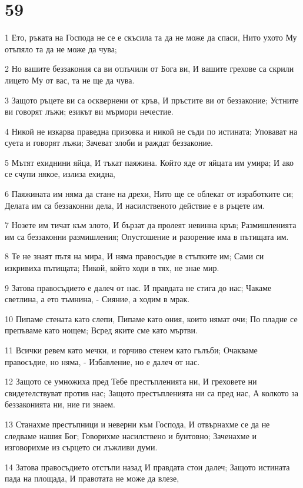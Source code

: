 \chapter{59}

\par 1 Ето, ръката на Господа не се е скъсила та да не може да спаси, Нито ухото Му отъпяло та да не може да чува;
\par 2 Но вашите беззакония са ви отлъчили от Бога ви, И вашите грехове са скрили лицето Му от вас, та не ще да чува.
\par 3 Защото ръцете ви са осквернени от кръв, И пръстите ви от беззаконие; Устните ви говорят лъжи; езикът ви мърмори нечестие.
\par 4 Никой не изкарва праведна призовка и никой не съди по истината; Уповават на суета и говорят лъжи; Зачеват злоби и раждат беззаконие.
\par 5 Мътят ехиднини яйца, И тъкат паяжина. Който яде от яйцата им умира; И ако се счупи някое, излиза ехидна,
\par 6 Паяжината им няма да стане на дрехи, Нито ще се облекат от изработките си; Делата им са беззаконни дела, И насилственото действие е в ръцете им.
\par 7 Нозете им тичат към злото, И бързат да пролеят невинна кръв; Размишленията им са беззаконни размишления; Опустошение и разорение има в пътищата им.
\par 8 Те не знаят пътя на мира, И няма правосъдие в стъпките им; Сами си изкривиха пътищата; Никой, който ходи в тях, не знае мир.
\par 9 Затова правосъдието е далеч от нас. И правдата не стига до нас; Чакаме светлина, а ето тъмнина, - Сияние, а ходим в мрак.
\par 10 Пипаме стената като слепи, Пипаме като ония, които нямат очи; По пладне се препъваме като нощем; Всред яките сме като мъртви.
\par 11 Всички ревем като мечки, и горчиво стенем като гълъби; Очакваме правосъдие, но няма, - Избавление, но е далеч от нас.
\par 12 Защото се умножиха пред Тебе престъпленията ни, И греховете ни свидетелствуват против нас; Защото престъпленията ни са пред нас, А колкото за беззаконията ни, ние ги знаем.
\par 13 Станахме престъпници и неверни към Господа, И отвърнахме се да не следваме нашия Бог; Говорихме насилствено и бунтовно; Заченахме и изговорихме из сърцето си лъжливи думи.
\par 14 Затова правосъдието отстъпи назад И правдата стои далеч; Защото истината пада на площада, И правотата не може да влезе,
